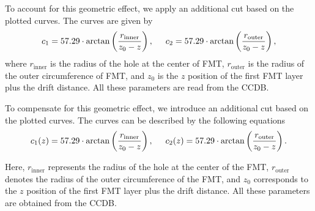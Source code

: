     To account for this geometric effect, we apply an additional cut based on the plotted curves.
    The curves are given by
    \begin{equation} \label{eq::fmt_geometry_cut}
        c_1 = 57.29 \cdot \arctan\left(\frac{r_\text{inner}}{z_0 - z}\right), \hspace{0.5cm}
        c_2 = 57.29 \cdot \arctan\left(\frac{r_\text{outer}}{z_0 - z}\right),
    \end{equation}
    where $r_\text{inner}$ is the radius of the hole at the center of FMT, $r_\text{outer}$ is the radius of the outer circumference of FMT, and $z_0$ is the $z$ position of the first FMT layer plus the drift distance.
    All these parameters are read from the CCDB.

    To compensate for this geometric effect, we introduce an additional cut based on the plotted curves.
    The curves can be described by the following equations
    \begin{equation} \label{eq::fmt_geometry_cut}
        c_1(z) = 57.29 \cdot \arctan\left(\frac{r_\text{inner}}{z_0 - z}\right),
        \hspace{0.5cm}
        c_2(z) = 57.29 \cdot \arctan\left(\frac{r_\text{outer}}{z_0 - z}\right).
    \end{equation}

    Here, $r_\text{inner}$ represents the radius of the hole at the center of the FMT, $r_\text{outer}$ denotes the radius of the outer circumference of the FMT, and $z_0$ corresponds to the $z$ position of the first FMT layer plus the drift distance.
    All these parameters are obtained from the CCDB.
